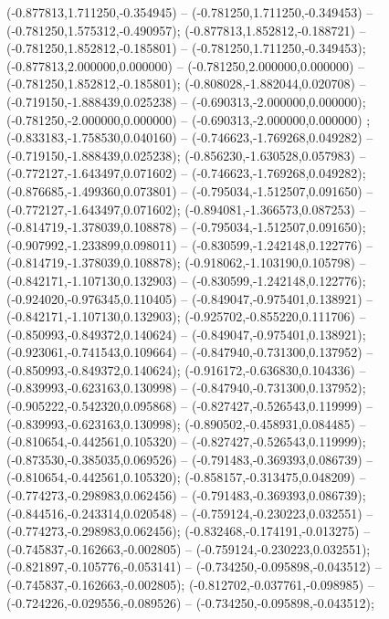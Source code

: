  (-0.877813,1.711250,-0.354945) -- (-0.781250,1.711250,-0.349453) -- (-0.781250,1.575312,-0.490957);
 (-0.877813,1.852812,-0.188721) -- (-0.781250,1.852812,-0.185801) -- (-0.781250,1.711250,-0.349453);
 (-0.877813,2.000000,0.000000) -- (-0.781250,2.000000,0.000000) -- (-0.781250,1.852812,-0.185801);
 (-0.808028,-1.882044,0.020708) -- (-0.719150,-1.888439,0.025238) -- (-0.690313,-2.000000,0.000000);
 (-0.781250,-2.000000,0.000000) -- (-0.690313,-2.000000,0.000000) ;
 (-0.833183,-1.758530,0.040160) -- (-0.746623,-1.769268,0.049282) -- (-0.719150,-1.888439,0.025238);
 (-0.856230,-1.630528,0.057983) -- (-0.772127,-1.643497,0.071602) -- (-0.746623,-1.769268,0.049282);
 (-0.876685,-1.499360,0.073801) -- (-0.795034,-1.512507,0.091650) -- (-0.772127,-1.643497,0.071602);
 (-0.894081,-1.366573,0.087253) -- (-0.814719,-1.378039,0.108878) -- (-0.795034,-1.512507,0.091650);
 (-0.907992,-1.233899,0.098011) -- (-0.830599,-1.242148,0.122776) -- (-0.814719,-1.378039,0.108878);
 (-0.918062,-1.103190,0.105798) -- (-0.842171,-1.107130,0.132903) -- (-0.830599,-1.242148,0.122776);
 (-0.924020,-0.976345,0.110405) -- (-0.849047,-0.975401,0.138921) -- (-0.842171,-1.107130,0.132903);
 (-0.925702,-0.855220,0.111706) -- (-0.850993,-0.849372,0.140624) -- (-0.849047,-0.975401,0.138921);
 (-0.923061,-0.741543,0.109664) -- (-0.847940,-0.731300,0.137952) -- (-0.850993,-0.849372,0.140624);
 (-0.916172,-0.636830,0.104336) -- (-0.839993,-0.623163,0.130998) -- (-0.847940,-0.731300,0.137952);
 (-0.905222,-0.542320,0.095868) -- (-0.827427,-0.526543,0.119999) -- (-0.839993,-0.623163,0.130998);
 (-0.890502,-0.458931,0.084485) -- (-0.810654,-0.442561,0.105320) -- (-0.827427,-0.526543,0.119999);
 (-0.873530,-0.385035,0.069526) -- (-0.791483,-0.369393,0.086739) -- (-0.810654,-0.442561,0.105320);
 (-0.858157,-0.313475,0.048209) -- (-0.774273,-0.298983,0.062456) -- (-0.791483,-0.369393,0.086739);
 (-0.844516,-0.243314,0.020548) -- (-0.759124,-0.230223,0.032551) -- (-0.774273,-0.298983,0.062456);
 (-0.832468,-0.174191,-0.013275) -- (-0.745837,-0.162663,-0.002805) -- (-0.759124,-0.230223,0.032551);
 (-0.821897,-0.105776,-0.053141) -- (-0.734250,-0.095898,-0.043512) -- (-0.745837,-0.162663,-0.002805);
 (-0.812702,-0.037761,-0.098985) -- (-0.724226,-0.029556,-0.089526) -- (-0.734250,-0.095898,-0.043512);
